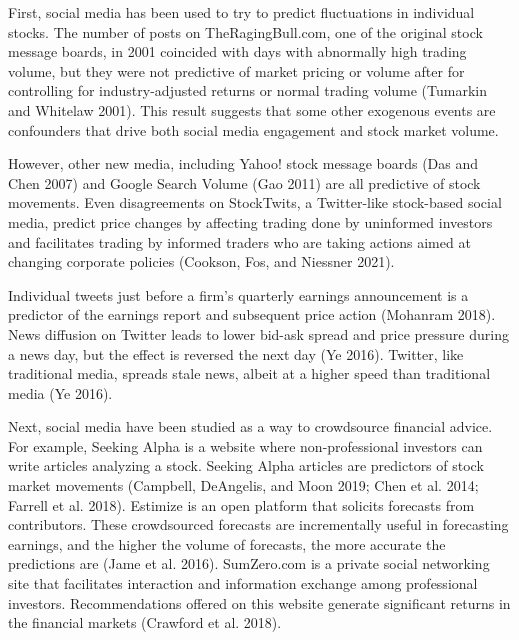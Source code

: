 \documentclass[12pt,]{article}
\begin{document}
First, social media has been used to try to predict fluctuations in
individual stocks. The number of posts on TheRagingBull.com, one of the
original stock message boards, in 2001 coincided with days with
abnormally high trading volume, but they were not predictive of market
pricing or volume after for controlling for industry-adjusted returns or
normal trading volume (Tumarkin and Whitelaw 2001). This result suggests
that some other exogenous events are confounders that drive both social
media engagement and stock market volume.

However, other new media, including Yahoo! stock message boards (Das and
Chen 2007) and Google Search Volume (Gao 2011) are all predictive of
stock movements. Even disagreements on StockTwits, a Twitter-like
stock-based social media, predict price changes by affecting trading
done by uninformed investors and facilitates trading by informed traders
who are taking actions aimed at changing corporate policies (Cookson,
Fos, and Niessner 2021).

Individual tweets just before a firm's quarterly earnings announcement
is a predictor of the earnings report and subsequent price action
(Mohanram 2018). News diffusion on Twitter leads to lower bid-ask spread
and price pressure during a news day, but the effect is reversed the
next day (Ye 2016). Twitter, like traditional media, spreads stale news,
albeit at a higher speed than traditional media (Ye 2016).

Next, social media have been studied as a way to crowdsource financial
advice. For example, Seeking Alpha is a website where non-professional
investors can write articles analyzing a stock. Seeking Alpha articles
are predictors of stock market movements (Campbell, DeAngelis, and Moon
2019; Chen et al. 2014; Farrell et al. 2018). Estimize is an open
platform that solicits forecasts from contributors. These crowdsourced
forecasts are incrementally useful in forecasting earnings, and the
higher the volume of forecasts, the more accurate the predictions are
(Jame et al. 2016). SumZero.com is a private social networking site that
facilitates interaction and information exchange among professional
investors. Recommendations offered on this website generate significant
returns in the financial markets (Crawford et al. 2018).
\end{document}
